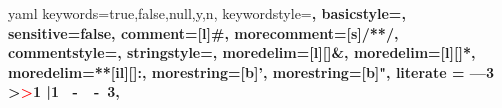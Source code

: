 \usepackage{lmodern}
\usepackage{listings}
\usepackage{color}
\usepackage{xcolor}
\usepackage{listings}
\usepackage{caption}
\usepackage{dirtytalk}


\newlength\myx
\setlength\myx{\textwidth}
\addtolength\myx{-2\fboxsep}

\captionsetup[lstlisting]{format=listing,labelfont=white,textfont=white}
\renewcommand{\lstlistingname}{Quelltext}

\setlength{\marginparwidth}{2cm}
\ifdraft
	\usepackage{todonotes}
\else
	\usepackage[disable]{todonotes}
\fi

\newcommand\YAMLcolonstyle{\color{red}\mdseries}
\newcommand\YAMLkeystyle{\color{black}\bfseries}
\newcommand\YAMLvaluestyle{\color{blue}\mdseries}

\makeatletter
\newcommand\language@yaml{yaml}

\expandafter\expandafter\expandafter\lstdefinelanguage
\expandafter{\language@yaml}
{
  keywords={true,false,null,y,n},
  keywordstyle=\color{darkgray}\bfseries,
  basicstyle=\YAMLkeystyle,                                 %
  sensitive=false,
  comment=[l]{\#},
  morecomment=[s]{/*}{*/},
  commentstyle=\color{purple}\ttfamily,
  stringstyle=\YAMLvaluestyle\ttfamily,
  moredelim=[l][\color{orange}]{\&},
  moredelim=[l][\color{magenta}]{*},
  moredelim=**[il][\YAMLcolonstyle{:}\YAMLvaluestyle]{:},   %
  morestring=[b]',
  morestring=[b]",
  literate =    {---}{{\ProcessThreeDashes}}3
                {>}{{\textcolor{red}\textgreater}}1     
                {|}{{\textcolor{red}\textbar}}1 
                {\ -\ }{{\mdseries\ -\ }}3,
}

\lst@AddToHook{EveryLine}{\ifx\lst@language\language@yaml\YAMLkeystyle\fi}
\makeatother

\newcommand\ProcessThreeDashes{\llap{\color{cyan}\mdseries-{-}-}}



